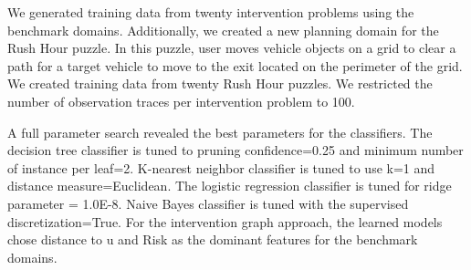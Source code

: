 \documentclass[letterpaper]{article}
\theoremstyle{plain}
\begin{document}
We generated training data from twenty intervention problems using the benchmark domains. Additionally, we created a new planning domain for the Rush Hour puzzle. In this puzzle, user moves vehicle objects on a grid to clear a path for a target vehicle to move to the exit located on the perimeter of the grid. We created training data from twenty Rush Hour puzzles. We restricted the number of observation traces per intervention problem to 100.
 
A full parameter search revealed the best parameters for the classifiers. The decision tree classifier is tuned to pruning confidence=0.25 and minimum number of instance per leaf=2. K-nearest neighbor classifier is tuned to use k=1 and distance measure=Euclidean. The logistic regression classifier is tuned for ridge parameter = 1.0E-8. Naive Bayes classifier is tuned with the supervised discretization=True. For the intervention graph approach, the learned models chose distance to $\mathrm{u}$ and Risk as the dominant features for the benchmark domains. %

% 
 
\end{document}
